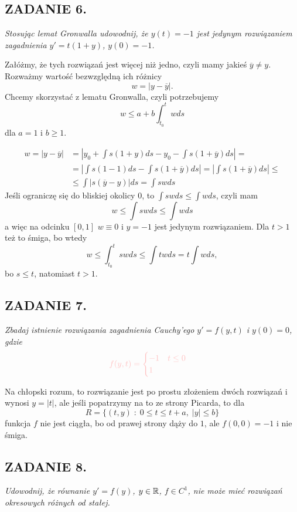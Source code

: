 \documentclass{article}
\begin{document}
\subsection*{ZADANIE 6.}
\emph{\color{pink}Stosując lemat Gronwalla udowodnij, że $y(t)=-1$ jest jedynym rozwiązaniem zagadnienia $y'=t(1+y)$, $y(0)=-1$.}

Załóżmy, że tych rozwiązań jest więcej niż jedno, czyli mamy jakieś $\overline y\neq y$. Rozważmy wartość bezwzględną ich różnicy
$$w=|y-\overline y|.$$
Chcemy skorzystać z lematu Gronwalla, czyli potrzebujemy
$$w\leq a+b\int_{t_0}^twds$$
dla $a=1$ i $b\geq1$.

\begin{align*}
    w=|y-\overline y|&=\left|y_0+\int s(1+y)ds-y_0-\int s(1+\overline y)ds\right|=\\
    &=\left|\int s(1-1)ds-\int s(1+\overline y)ds\right|=\left|\int s(1+\overline y)ds\right|\leq\\
    &\leq\int|s(\overline y-y)|ds=\int swds
\end{align*}
Jeśli ograniczę się do bliskiej okolicy $0$, to $\int swds\leq \int wds$, czyli mam
$$w\leq \int swds\leq \int wds$$
a więc na odcinku $[0, 1]$ $w\equiv 0$ i $y=-1$ jest jedynym rozwiązaniem. Dla $t>1$ też to śmiga, bo wtedy
$$w\leq\int_{t_0}^tswds\leq \int twds=t\int wds,$$
bo $s\leq t$, natomiast $t>1$.

\subsection*{ZADANIE 7.}
\emph{\color{pink}Zbadaj istnienie rozwiązania zagadnienia Cauchy'ego $y'=f(y, t)$ i $y(0)=0$, gdzie}
$$\color{pink}f(y, t)=\begin{cases}
    -1\quad t\leq 0\\
    1
\end{cases}$$

Na chłopski rozum, to rozwiązanie jest po prostu złożeniem dwóch rozwiązań i wynosi $y=|t|$, ale jeśli popatrzymy na to ze strony Picarda, to dla
$$R=\{(t, y)\;:\;0\leq t\leq t+a,\;|y|\leq b\}$$
funkcja $f$ nie jest ciągła, bo od prawej strony dąży do $1$, ale $f(0, 0)=-1$ i nie śmiga.

\subsection*{ZADANIE 8.}
\emph{\color{blue}Udowodnij, że równanie $y'=f(y)$, $y\in\mathbb{R}$, $f\in C^1$, nie może mieć rozwiązań okresowych różnych od stałej.}
\end{document}
